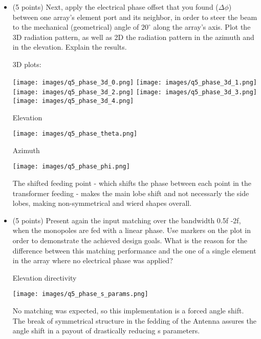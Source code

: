 \documentclass[12pt, letterpaper]{article}
\begin{document}
\begin{itemize}
  \item (5 points) Next, apply the electrical phase offset that you found ($\Delta\phi$) between one array's element port and its neighbor, in order to steer the beam to the mechanical (geometrical) angle of $20^{\circ}$ along the array's axis. Plot the 3D radiation pattern, as well as 2D the radiation pattern in the azimuth and in the elevation. Explain the results.


  \begin{center}
    3D plots:
  \end{center}

  \texttt{[image: images/q5\_phase\_3d\_0.png]}
  \texttt{[image: images/q5\_phase\_3d\_1.png]}
  \texttt{[image: images/q5\_phase\_3d\_2.png]}
  \texttt{[image: images/q5\_phase\_3d\_3.png]}
  \texttt{[image: images/q5\_phase\_3d\_4.png]}

  \pagebreak
  \begin{center}
    Elevation
  \end{center}
  \texttt{[image: images/q5\_phase\_theta.png]}


  \pagebreak
  \begin{center}
    Azimuth
  \end{center}
  \texttt{[image: images/q5\_phase\_phi.png]}

  {\color{blue}The shifted feeding point - which shifts the phase between each point in the transformer feeding - makes the main lobe shift and not necessarly the side lobes, making non-symmetrical and wierd shapes overall.}

  \item (5 points) Present again the input matching over the bandwidth 0.5f -2f, when the monopoles are fed with a linear phase. Use markers on the plot in order to demonstrate the achieved design goals. What is the reason for the difference between this matching performance and the one of a single element in the array where no electrical phase was applied?

  \pagebreak
  \begin{center}
    Elevation directivity
  \end{center}
  \texttt{[image: images/q5\_phase\_s\_params.png]}

  {\color{blue}No matching was expected, so this implementation is a forced angle shift. The break of symmetrical structure in the fedding of the Antenna assures the angle shift in a payout of drastically reducing s parameters.}

\end{itemize}
\end{document}
